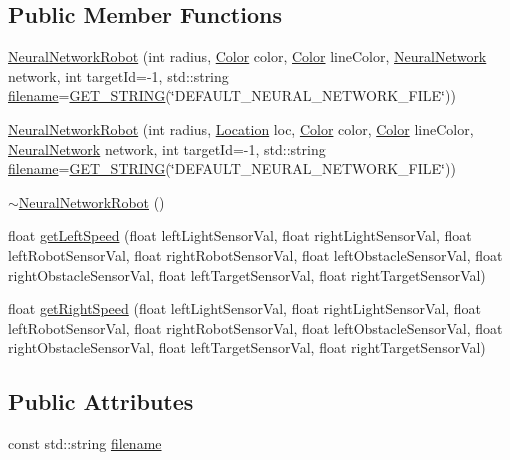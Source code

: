 \subsection*{Public Member Functions}
\begin{DoxyCompactItemize}
\item 
\hyperlink{classNeuralNetworkRobot_adee0b00b83cd1f9269efd5178f4320b3}{Neural\-Network\-Robot} (int radius, \hyperlink{structColor}{Color} color, \hyperlink{structColor}{Color} line\-Color, \hyperlink{classNeuralNetwork}{Neural\-Network} network, int target\-Id=-\/1, std\-::string \hyperlink{classNeuralNetworkRobot_a6ccb2a3dcfa6c5616fede96f7468d065}{filename}=\hyperlink{configuration_8h_ae7f5355b60ff97037b8008b7f6d6aa74}{G\-E\-T\-\_\-\-S\-T\-R\-I\-N\-G}(\char`\"{}D\-E\-F\-A\-U\-L\-T\-\_\-\-N\-E\-U\-R\-A\-L\-\_\-\-N\-E\-T\-W\-O\-R\-K\-\_\-\-F\-I\-L\-E\char`\"{}))
\item 
\hyperlink{classNeuralNetworkRobot_a016aaca79a56d7cd2b04583188541359}{Neural\-Network\-Robot} (int radius, \hyperlink{structLocation}{Location} loc, \hyperlink{structColor}{Color} color, \hyperlink{structColor}{Color} line\-Color, \hyperlink{classNeuralNetwork}{Neural\-Network} network, int target\-Id=-\/1, std\-::string \hyperlink{classNeuralNetworkRobot_a6ccb2a3dcfa6c5616fede96f7468d065}{filename}=\hyperlink{configuration_8h_ae7f5355b60ff97037b8008b7f6d6aa74}{G\-E\-T\-\_\-\-S\-T\-R\-I\-N\-G}(\char`\"{}D\-E\-F\-A\-U\-L\-T\-\_\-\-N\-E\-U\-R\-A\-L\-\_\-\-N\-E\-T\-W\-O\-R\-K\-\_\-\-F\-I\-L\-E\char`\"{}))
\item 
\hyperlink{classNeuralNetworkRobot_a881db4125bc7390a49f0603a51a38ff1}{$\sim$\-Neural\-Network\-Robot} ()
\item 
float \hyperlink{classNeuralNetworkRobot_a91c4210b62175e9ffb1ed3362df318af}{get\-Left\-Speed} (float left\-Light\-Sensor\-Val, float right\-Light\-Sensor\-Val, float left\-Robot\-Sensor\-Val, float right\-Robot\-Sensor\-Val, float left\-Obstacle\-Sensor\-Val, float right\-Obstacle\-Sensor\-Val, float left\-Target\-Sensor\-Val, float right\-Target\-Sensor\-Val)
\item 
float \hyperlink{classNeuralNetworkRobot_a7b3389e89eb3485ad9e074494624e204}{get\-Right\-Speed} (float left\-Light\-Sensor\-Val, float right\-Light\-Sensor\-Val, float left\-Robot\-Sensor\-Val, float right\-Robot\-Sensor\-Val, float left\-Obstacle\-Sensor\-Val, float right\-Obstacle\-Sensor\-Val, float left\-Target\-Sensor\-Val, float right\-Target\-Sensor\-Val)
\end{DoxyCompactItemize}
\subsection*{Public Attributes}
\begin{DoxyCompactItemize}
\item 
const std\-::string \hyperlink{classNeuralNetworkRobot_a6ccb2a3dcfa6c5616fede96f7468d065}{filename}
\end{DoxyCompactItemize}
